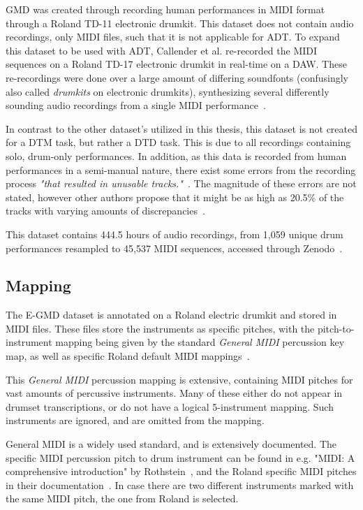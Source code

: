 GMD was created through recording human performances in MIDI format through a Roland TD-11 electronic drumkit. This dataset does not contain audio recordings, only MIDI files, such that it is not applicable for \gls{ADT}. To expand this dataset to be used with \gls{ADT}, Callender et al. re-recorded the MIDI sequences on a Roland TD-17 electronic drumkit in real-time on a \gls{DAW}. These re-recordings were done over a large amount of differing soundfonts (confusingly also called \textit{drumkits} on electronic drumkits), synthesizing several differently sounding audio recordings from a single MIDI performance~\cite{pmlr-v97-gillick19a, callender2020improvingperceptualqualitydrum}.

In contrast to the other dataset's utilized in this thesis, this dataset is not created for a \gls{DTM} task, but rather a \gls{DTD} task. This is due to all recordings containing solo, drum-only performances. In addition, as this data is recorded from human performances in a semi-manual nature, there exist some errors from the recording process \textit{"that resulted in unusable tracks."}~\cite{callender2020improvingperceptualqualitydrum}. The magnitude of these errors are not stated, however other authors propose that it might be as high as 20.5\% of the tracks with varying amounts of discrepancies~\cite{holz2021automatic}.

This dataset contains 444.5 hours of audio recordings, from 1,059 unique drum performances resampled to 45,537 MIDI sequences, accessed through Zenodo~\cite{callender_2020_4300943}.

\subsection{Mapping}

The E-GMD dataset is annotated on a Roland electric drumkit and stored in MIDI files. These files store the instruments as specific pitches, with the pitch-to-instrument mapping being given by the standard \textit{General MIDI} percussion key map, as well as specific Roland default MIDI mappings~\cite{roland_drum_midi_td_17}.

This \textit{General MIDI} percussion mapping is extensive, containing MIDI pitches for vast amounts of percussive instruments. Many of these either do not appear in drumset transcriptions, or do not have a logical 5-instrument mapping. Such instruments are ignored, and are omitted from the mapping.

General MIDI is a widely used standard, and is extensively documented. The specific MIDI percussion pitch to drum instrument can be found in e.g. "MIDI: A comprehensive introduction" by Rothstein~\cite{rothstein1995midi}, and the Roland specific MIDI pitches in their documentation~\cite{roland_drum_midi_td_17}. In case there are two different instruments marked with the same MIDI pitch, the one from Roland is selected.

